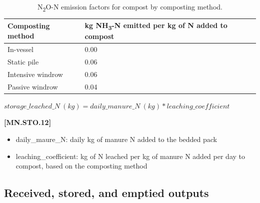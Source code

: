 \begin{refsection}
    \begin{table}[h!]
    \centering
    \renewcommand{\arraystretch}{1.3}
    \begin{center}
        \caption{N\textsubscript{2}O-N  emission factors for compost by composting method.}
    \end{center}

    \begin{tabular}{@{} C{3cm} C{4cm}  @{}}
    \toprule
    \textbf{Composting method} & \textbf{kg NH\textsubscript{3}-N emitted per kg of N added to compost}   \\
    \midrule


In-vessel & 0.00 \\
Static pile & 0.06 \\
Intensive windrow & 0.06 \\
Passive windrow & 0.04 \\


    \bottomrule
    \end{tabular}
    \end{table} 
            \vspace{0.25cm}

        \begin{center}
            \(storage\_leached\_N\ (kg) = daily\_manure\_N\ (kg) * leaching\_coefficient\)
        \end{center}
        \vspace{0.5cm} 
    
            {\raggedleft \textbf{[MN.STO.12]}\par}
            \vspace{0.5cm}
            
        \begin{itemize}
            \item daily\_maure\_N: daily kg of manure N added to the bedded pack 
            \item leaching\_coefficient: kg of N leached per kg of manure N added per day to compost, based on the composting method


        \end{itemize}



\vspace{ 0.5cm}
\subsection{Received, stored, and emptied outputs}
\vspace{ 0.25cm}


\end{refsection}

